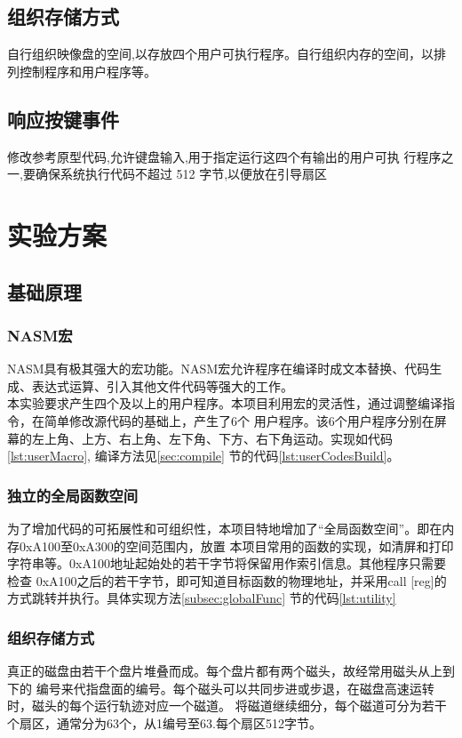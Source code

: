 \documentclass[a4paper]{article}
\newcommand{\codev}[1]{\textsf{#1}}
\begin{document}
    \subsection{组织存储方式}
    自行组织映像盘的空间,以存放四个用户可执行程序。自行组织内存的空间，以排列控制程序和用户程序等。
    \subsection{响应按键事件}
    修改参考原型代码,允许键盘输入,用于指定运行这四个有输出的用户可执
    行程序之一,要确保系统执行代码不超过 512 字节,以便放在引导扇区
\section{实验方案}
    \subsection{基础原理}
    \subsubsection{NASM宏}  
    NASM具有极其强大的宏功能。NASM宏允许程序在编译时成文本替换、代码生成、表达式运算、引入其他文件代码等强大的工作。\\
    
    本实验要求产生四个及以上的用户程序。本项目利用宏的灵活性，通过调整编译指令，在简单修改源代码的基础上，产生了6个
    用户程序。该6个用户程序分别在屏幕的左上角、上方、右上角、左下角、下方、右下角运动。实现如代码\ref{lst:userMacro},
    编译方法见\ref{sec:compile}
    节的代码\ref{lst:userCodesBuild}。
    \subsubsection{独立的全局函数空间} 
    为了增加代码的可拓展性和可组织性，本项目特地增加了``全局函数空间''。即在内存0xA100至0xA300的空间范围内，放置
    本项目常用的函数的实现，如清屏和打印字符串等。0xA100地址起始处的若干字节将保留用作索引信息。其他程序只需要检查
    0xA100之后的若干字节，即可知道目标函数的物理地址，并采用\codev{call [reg]}的方式跳转并执行。具体实现方法\ref{subsec:globalFunc}
    节的代码\ref{lst:utility}
    \subsubsection{组织存储方式}
    真正的磁盘由若干个盘片堆叠而成。每个盘片都有两个磁头，故经常用磁头从上到下的
    编号来代指盘面的编号。每个磁头可以共同步进或步退，在磁盘高速运转时，磁头的每个运行轨迹对应一个磁道。
    将磁道继续细分，每个磁道可分为若干个扇区，通常分为63个，从1编号至63.每个扇区512字节。\\
    
\end{document}
